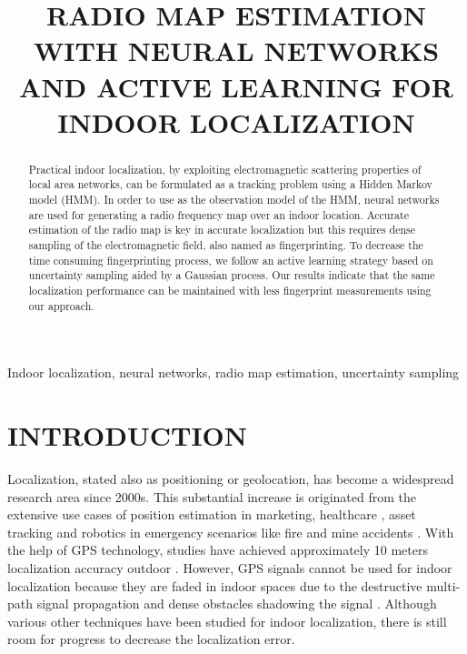 \documentclass{article}
\title{RADIO MAP ESTIMATION WITH NEURAL NETWORKS AND ACTIVE LEARNING FOR INDOOR LOCALIZATION}
\begin{document}
	\maketitle
	\begin{abstract}
		Practical indoor localization, by exploiting electromagnetic scattering properties of local area networks, can be formulated as a tracking problem using a Hidden Markov model (HMM). In order to use as the observation model of the HMM, neural networks are used for generating a radio frequency map over an indoor location. Accurate estimation of the radio map is key in accurate localization but this requires dense sampling of the electromagnetic field, also named as fingerprinting. To decrease the time consuming fingerprinting process, we follow an active learning strategy based on uncertainty sampling aided by a Gaussian process. Our results indicate that the same localization performance can be maintained with less fingerprint measurements using our approach.
	\end{abstract}
	\begin{keywords}
		Indoor localization, neural networks, radio map estimation, uncertainty sampling
	\end{keywords}
	\section{INTRODUCTION}
	\label{sec:intro}
	Localization, stated also as positioning or geolocation, has become a widespread research area since 2000s. This substantial increase is originated from the extensive use cases of position estimation in marketing, healthcare \cite{Cal2015}, asset tracking and robotics in emergency scenarios like fire and mine accidents \cite{Zha2009}. With the help of GPS technology, studies have achieved approximately 10 meters localization accuracy outdoor \cite{Dju2001}. However, GPS signals cannot be used for indoor localization because they are faded in indoor spaces due to the destructive multi-path signal propagation and dense obstacles shadowing the signal \cite{bah2000,Bat2002}. Although various other techniques have been studied for indoor localization, there is still room for progress to decrease the localization error. 
	
\end{document}
